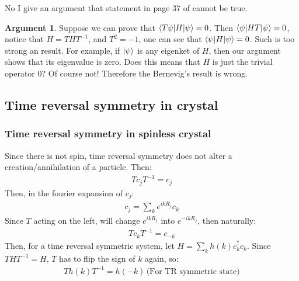 \documentclass{article}
\numberwithin{equation}{subsection} %
\theoremstyle{definition}
\newtheorem{argument}{Argument}[section]
\begin{document}
        No I give an argument that statement in page 37 of
        \cite{bernevig} cannot be true.
        \begin{argument}
            Suppose we can prove that $\braket{T \psi|H|\psi}=0$.
            Then $\braket{\psi|HT |\psi}=0$, notice that $H=T
            HT^{-1}$, and $T^{2}=-1$, one can see that
            $\braket{\psi|H|\psi}=0$. Such is too strong an result. For
            example, if $\ket{\psi}$ is any eigenket of $H$, then our
            argument shows that its eigenvalue is zero. Does this means
            that $H$ is just the trivial operator $0$? Of course not!
            Therefore the Bernevig's result is wrong.
        \end{argument}
    
    \subsection{Time reversal symmetry in crystal}
    \label{sec:Time-reversal-symmetry-in-crystal}
    
        \subsubsection{Time reversal symmetry in spinless crystal}
        \label{sec:Time-reversal-symmetry-in-spinless-}
        Since there is not spin, time reversal symmetry does not alter a
        creation/annihilation of a particle. Then:
        \begin{align}
            Tc_j T^{-1} = c_j
        \end{align}
        Then, in the fourier expansion of $c_j$:
        \begin{align}
            c_j = \sum_k e^{ikR_j} c_k
        \end{align}
        Since $T$ acting on the left, will change $e^{ikR_j}$ into
        $e^{-ikR_j}$, then naturally:
        \begin{align}
            Tc_k T^{-1} = c_{-k}
        \end{align}
        Then, for a time reversal symmetric system, let 
        $H = \sum_k h(k)c_k^\dagger c_k$. Since $T H T^{-1}=H$,
        $T$ has to flip the sign of $k$ again, so:
        \begin{align}
            T h(k) T^{-1} = h(-k) \,\text{(For TR symmetric
            state)}
            \label{eq:TRoper.trInCry.trInSpinless.hk}
        \end{align}
        
\end{document}
